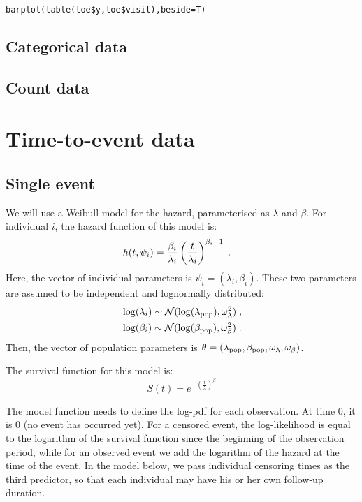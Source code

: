 {\begin{verbatim}
barplot(table(toe$y,toe$visit),beside=T)
\end{verbatim}



\subsection{Categorical data} \label{sec:knee}

\subsection{Count data}

\section{Time-to-event data}

\subsection{Single event} \label{sec:lungtte}

We will use a Weibull model for the hazard, parameterised as $\lambda$ and $\beta$. For individual $i$, the hazard function of this model is:
\begin{align}\label{weibullmodel}
& h(t, \psi_i) = \frac{\beta_i}{\lambda_i}\left(\frac{t}{\lambda_i}\right)^{\beta_i-1}\;.
\end{align}
Here, the vector of individual parameters is $\psi_i = (\lambda_i, \beta_i)$. These two parameters are assumed to be independent and  lognormally distributed:
\begin{align} \label{indivtte}
& \log(\lambda_i) \sim \mathcal{N}(\log(\lambda_{\rm pop}), \omega^2_{\lambda})\;,\\
& \log(\beta_i) \sim \mathcal{N}(\log(\beta_{\rm pop}), \omega^2_{\beta})\;.
\end{align}
Then, the vector of population parameters is $\theta = (\lambda_{\rm pop}, \beta_{\rm pop}, \omega_{\lambda}, \omega_{\beta})$.

The survival function for this model is:
$$ S(t) = e^{ - \left( \frac{t}{\lambda} \right) ^{\beta}}$$

The model function needs to define the log-pdf for each observation. At time 0, it is 0 (no event has occurred yet). For a censored event, the log-likelihood is equal to the logarithm of the survival function since the beginning of the observation period, while for an observed event we add the logarithm of the hazard at the time of the event. In the model below, we pass individual censoring times as the third predictor, so that each individual may have his or her own follow-up duration.

}
